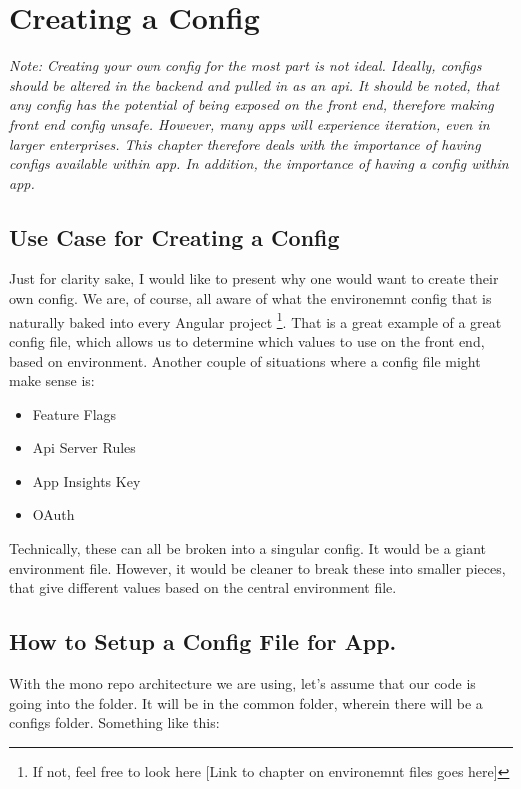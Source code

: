 
\section{ Creating a Config }

\textit{ Note: Creating your own config for the most part is not ideal. Ideally,
configs should be altered in the backend and pulled in as an api. It should be
noted, that any config has the potential of being exposed on the front end,
therefore making front end config unsafe. However, many apps will experience
iteration, even in larger enterprises. This chapter therefore deals with the
importance of having configs available within app. In addition, the importance
of having a config within app.}

\subsection{ Use Case for Creating a Config }
Just for clarity sake, I would like to present why one would want to create
their own config. We are, of course, all aware of what the environemnt config
that is naturally baked into every Angular project \footnote{If not, feel free
to look here [Link to chapter on environemnt files goes here]}. That is a great
example of a great config file, which allows us to determine which values to
use on the front end, based on environment. Another couple of situations where
a config file might make sense is:
\begin{itemize}
  \item Feature Flags
  \item Api Server Rules
  \item App Insights Key
  \item OAuth
\end{itemize}

Technically, these can all be broken into a singular config. It would be a giant
environment file. However, it would be cleaner to break these into smaller
pieces, that give different values based on the central environment file.

\subsection{ How to Setup a Config File for App. }

With the mono repo architecture we are using, let's assume that our code is
going into the \appNameKebabCase{} folder. It will be in the common folder,
wherein there will be a configs folder. Something like this:

